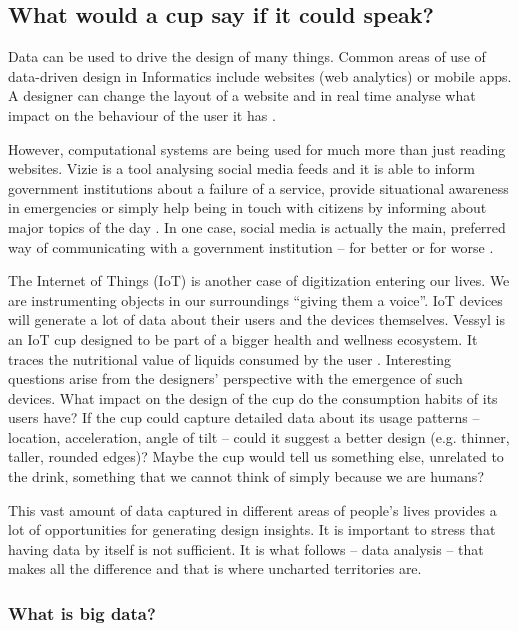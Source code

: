 		\subsection{What would a cup say if it could speak?}

Data can be used to drive the design of many things. Common areas of use of data-driven design in Informatics include websites (web analytics) or mobile apps. A designer can change the layout of a website and in real time analyse what impact on the behaviour of the user it has \citep{CSIRO2015}.

However, computational systems are being used for much more than just reading websites. Vizie is a tool analysing social media feeds and it is able to inform government institutions about a failure of a service, provide situational awareness in emergencies or simply help being in touch with citizens by informing about major topics of the day \citep{CSIRO2015a}. In one case, social media is actually the main, preferred way of communicating with a government institution – for better or for worse \citep{MITMediaLab2015}.

The Internet of Things (IoT) is another case of digitization entering our lives. We are instrumenting objects in our surroundings “giving them a voice”. IoT devices will generate a lot of data about their users and the devices themselves. Vessyl is an IoT cup designed to be part of a bigger health and wellness ecosystem. It traces the nutritional value of liquids consumed by the user \citep{MarkOne2014}. Interesting questions arise from the designers’ perspective with the emergence of such devices. What impact on the design of the cup do the consumption habits of its users have? If the cup could capture detailed data about its usage patterns – location, acceleration, angle of tilt – could it suggest a better design (e.g. thinner, taller, rounded edges)? Maybe the cup would tell us something else, unrelated to the drink, something that we cannot think of simply because we are humans?

This vast amount of data captured in different areas of people’s lives provides a lot of opportunities for generating design insights. It is important to stress that having data by itself is not sufficient. It is what follows – data analysis – that makes all the difference and that is where uncharted territories are.

			\subsubsection{What is big data?}

